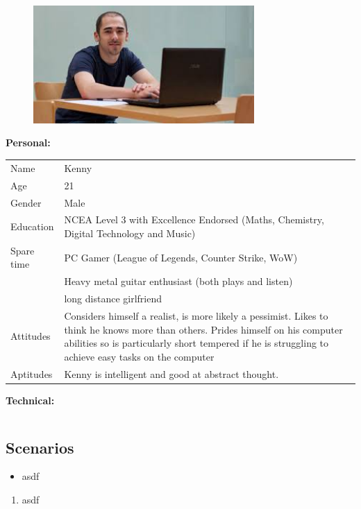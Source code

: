 \begin{figure}[h]
	\centering
	\includegraphics[width = 0.75\textwidth]{images/index.jpg}
\end{figure}
\noindent
\textbf{Personal: }\\
\begin{tabularx}{\textwidth}{l X}
	Name & Kenny\\
	Age & 21\\
	Gender & Male\\
	Education & NCEA Level 3 with Excellence Endorsed (Maths, Chemistry, Digital Technology and Music)\\
	Spare time & PC Gamer (League of Legends, Counter Strike, WoW)\\
	& Heavy metal guitar enthusiast (both plays and listen)\\
	& long distance girlfriend\\
	Attitudes & Considers himself a realist, is more likely a pessimist. Likes to think he knows more than others. Prides himself on his computer abilities so is particularly short tempered  if he is struggling to achieve easy tasks on the computer\\
	Aptitudes & Kenny is intelligent and good at abstract thought.
\end{tabularx}
\noindent
\textbf{Technical: }\\
\begin{tabularx}{\textwidth}{l X}

\end{tabularx}

\pagebreak

\subsection{Scenarios}

\begin{itemize}
	\item asdf
\end{itemize}

\begin{enumerate}
	\item asdf
\end{enumerate}